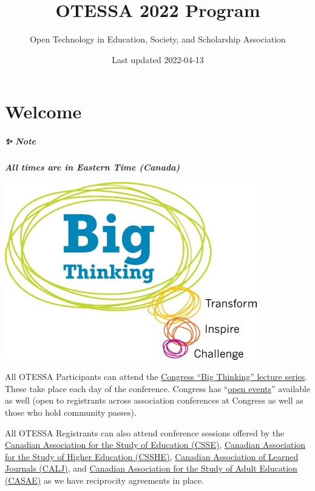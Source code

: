 \documentclass[
]{book}
\title{OTESSA 2022 Program}
\author{Open Technology in Education, Society, and Scholarship Association}
\date{Last updated 2022-04-13}
\begin{document}
\maketitle

{
\setcounter{tocdepth}{1}
\tableofcontents
}
\hypertarget{welcome}{%
\chapter*{Welcome}\label{welcome}}

\begin{todo}
\hypertarget{note}{%
\paragraph*{✨ Note}\label{note}}

\textbf{\emph{All times are in Eastern Time (Canada)}}
\end{todo}

\includegraphics{assets/media/image2.jpeg}

All OTESSA Participants can attend the \href{https://www.federationhss.ca/en/congress/congress-2022/open-programming}{Congress ``Big Thinking'' lecture series}. These take place each day of the conference. Congress has ``\href{https://www.federationhss.ca/en/congress/congress-2022/calendar-open-events}{open events}'' available as well (open to registrants across association conferences at Congress as well as those who hold community passes).

All OTESSA Registrants can also attend conference sessions offered by the \href{https://csse-scee.ca/}{Canadian Association for the Study of Education (CSSE)}, \href{https://csshe-scees.ca/}{Canadian Association for the Study of Higher Education (CSSHE)}, \href{https://www.calj-acrs.ca/}{Canadian Association of Learned Journals (CALJ)}, and \href{https://www.casae-aceea.ca/}{Canadian Association for the Study of Adult Education (CASAE)} as we have reciprocity agreements in place.
\end{document}
